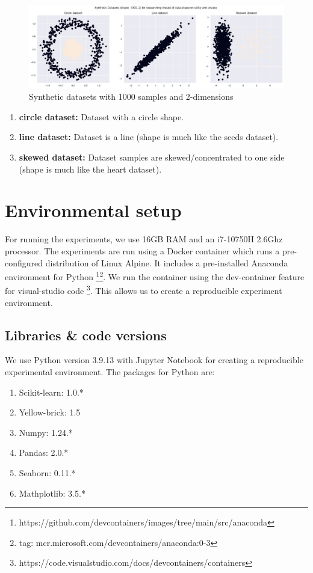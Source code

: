 \begin{figure}[H]
  \includegraphics[width=1.0\textwidth]{Method/images/rq3.png}
  \caption{Synthetic datasets with 1000 samples and 2-dimensions}
  \label{rq3:synthetic-datasets}
\end{figure}
\begin{enumerate}
  \item \textbf{circle dataset:} Dataset with a circle shape.
  \item \textbf{line dataset:} Dataset is a line (shape is much like the seeds dataset).
  \item \textbf{skewed dataset:} Dataset samples are skewed/concentrated to one side (shape is much like the heart dataset).
\end{enumerate}
\section{Environmental setup}
For running the experiments, we use 16GB RAM and an i7-10750H 2.6Ghz processor.
The experiments are run using a Docker container which runs a pre-configured distribution of Linux Alpine.
It includes a pre-installed Anaconda environment for Python \footnote{https://github.com/devcontainers/images/tree/main/src/anaconda}\footnote{tag: mcr.microsoft.com/devcontainers/anaconda:0-3}.
We run the container using the dev-container feature for visual-studio code \footnote{https://code.visualstudio.com/docs/devcontainers/containers}.
This allows us to create a reproducible experiment environment.
\subsection{Libraries \& code versions}
We use Python version 3.9.13 with Jupyter Notebook for creating a reproducible experimental environment.
The packages for Python are:
\begin{enumerate}
  \item Scikit-learn: 1.0.*
  \item Yellow-brick: 1.5
  \item Numpy: 1.24.*
  \item Pandas: 2.0.*
  \item Seaborn: 0.11.*
  \item Mathplotlib: 3.5.*
\end{enumerate}

